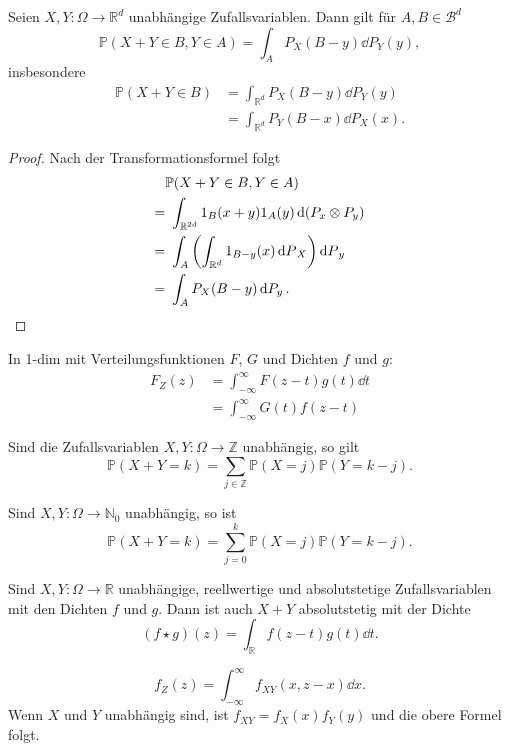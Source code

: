 \documentclass[prb,12pt, twocolumn]{revtex4-2}
\theoremstyle{definition}
\theoremstyle{definition}
\theoremstyle{definition}
\newcommand{\N}{\mathbb{N}}
\newcommand{\R}{\mathbb{R}}
\newcommand{\Z}{\mathbb{Z}}
\begin{document}
\begin{Note}[Faltung]
	Seien $X,Y:\Omega \to \R^d$ unabh\"{a}ngige Zufallsvariablen. Dann gilt f\"{u}r $A,B\in \mathcal{B}^d$ 
	\[
		\mathbb{P}(X+Y\in B, Y\in A)=\int_A P_X(B-y)\dd{P}_Y(y)
	,\]
	insbesondere
	\begin{align*}
		\mathbb{P}(X+Y\in B)&=\int_{\R^d} P_X(B-y)\dd{P_Y(y)} \\
				    &= \int_{\R^d} P_Y(B-x)\dd{P_X(x)}
			    .\end{align*}
\end{Note}
\begin{proof}
	Nach der Transformationsformel folgt
	\begin{align*}
		&\mathbb{P}(X+Y\in B, Y\in A)\\
		=&~\int_{\R^{2d}}1_B(x+y)1_A(y)\dd{(P_x\otimes P_y)}\\
		=&~\int_A \left(\int_{\R^d} 1_{B-y}(x)\dd{P}_X\right)\dd{P}_y\\
		=&~\int_A P_X(B-y)\dd{P_y}.\qedhere
	\end{align*}
\end{proof}
\begin{Note}
	In 1-dim mit Verteilungsfunktionen $F$, $G$ und Dichten $f$ und $g$:
	\begin{align*}
		F_Z(z) &= \int_{-\infty}^\infty F(z-t)g(t)\dd{t}\\
		&= \int_{-\infty}^\infty G(t)f(z-t)
	\end{align*}
\end{Note}
\begin{Note}
	Sind die Zufallsvariablen $X,Y:\Omega \to \Z$ unabh\"{a}ngig, so gilt
	\[
		\mathbb{P}(X+Y=k)=\sum_{j\in \Z}\mathbb{P}(X=j)\mathbb{P}(Y=k-j)
	.\] 
\end{Note}
\begin{Note}
	Sind $X,Y:\Omega \to \N_0$ unabh\"{a}ngig, so ist
	\[
		\mathbb{P}(X+Y=k)=\sum_{j=0}^k \mathbb{P}(X=j)\mathbb{P}(Y=k-j)
	.\] 
\end{Note}
\begin{Note}
	Sind $X,Y:\Omega\to \R$ unabh\"{a}ngige, reellwertige und absolutstetige Zufallsvariablen mit den Dichten $f$ und $g$. Dann ist auch $X+Y$ absolutstetig mit der Dichte
	\[
		(f\star g)(z) = \int_\R f(z-t)g(t)\dd{t}
	.\] 
\end{Note}
\begin{Note}
	\[f_Z(z)=\int_{-\infty}^\infty f_{XY}(x, z-x)\dd{x}.\]
Wenn $X$ und $Y$ unabh\"{a}ngig sind, ist $f_{XY}=f_X(x)f_Y(y)$ und die obere Formel folgt.
\end{Note}
\end{document}
